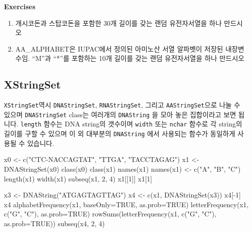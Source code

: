 \documentclass[
  a4paper,
]{book}
\newenvironment{Shaded}{\begin{snugshade}}{\end{snugshade}}
\newcommand{\AttributeTok}[1]{\textcolor[rgb]{0.40,0.45,0.13}{#1}}
\newcommand{\ConstantTok}[1]{\textcolor[rgb]{0.56,0.35,0.01}{#1}}
\newcommand{\DecValTok}[1]{\textcolor[rgb]{0.68,0.00,0.00}{#1}}
\newcommand{\FunctionTok}[1]{\textcolor[rgb]{0.28,0.35,0.67}{#1}}
\newcommand{\NormalTok}[1]{\textcolor[rgb]{0.00,0.23,0.31}{#1}}
\newcommand{\OtherTok}[1]{\textcolor[rgb]{0.00,0.23,0.31}{#1}}
\newcommand{\SpecialCharTok}[1]{\textcolor[rgb]{0.37,0.37,0.37}{#1}}
\newcommand{\StringTok}[1]{\textcolor[rgb]{0.13,0.47,0.30}{#1}}
\begin{document}
\textbf{Exercises}

\begin{enumerate}
\def\labelenumi{\arabic{enumi})}
\item
  개시코돈과 스탑코돈을 포함한 30개 길이를 갖는 랜덤 유전자서열을 하나
  만드시오
\item
  AA\_ALPHABET은 IUPAC에서 정의된 아미노산 서열 알파벳이 저장된
  내장변수임. ``M''과 ``*''를 포함하는 10개 길이를 갖는 랜덤
  유전자서열을 하나 만드시오
\end{enumerate}

\hypertarget{xstringset}{%
\subsection{XStringSet}\label{xstringset}}

\texttt{XStringSet}역시 \texttt{DNAStringSet}, \texttt{RNAStringSet},
그리고 \texttt{AAStringSet}으로 나눌 수 있으며 \texttt{DNAStringSet}
class는 여러개의 \texttt{DNAString} 을 모아 놓은 집합이라고 보면 됩니다.
\texttt{length} 함수는 DNA string의 갯수이며 \texttt{width} 또는
\texttt{nchar} 함수로 각 string의 길이를 구할 수 있으며 이 외 대부분의
\texttt{DNAString} 에서 사용되는 함수가 동일하게 사용될 수 있습니다.

\begin{Shaded}
\begin{Highlighting}[]
\NormalTok{x0 }\OtherTok{\textless{}{-}} \FunctionTok{c}\NormalTok{(}\StringTok{"CTC{-}NACCAGTAT"}\NormalTok{, }\StringTok{"TTGA"}\NormalTok{, }\StringTok{"TACCTAGAG"}\NormalTok{)}
\NormalTok{x1 }\OtherTok{\textless{}{-}} \FunctionTok{DNAStringSet}\NormalTok{(x0)}
\FunctionTok{class}\NormalTok{(x0)}
\FunctionTok{class}\NormalTok{(x1)}
\FunctionTok{names}\NormalTok{(x1)}
\FunctionTok{names}\NormalTok{(x1) }\OtherTok{\textless{}{-}} \FunctionTok{c}\NormalTok{(}\StringTok{"A"}\NormalTok{, }\StringTok{"B"}\NormalTok{, }\StringTok{"C"}\NormalTok{)}
\FunctionTok{length}\NormalTok{(x1)}
\FunctionTok{width}\NormalTok{(x1)}
\FunctionTok{subseq}\NormalTok{(x1, }\DecValTok{2}\NormalTok{, }\DecValTok{4}\NormalTok{)}
\NormalTok{x1[[}\DecValTok{1}\NormalTok{]]}
\NormalTok{x1[}\DecValTok{1}\NormalTok{]}


\NormalTok{x3 }\OtherTok{\textless{}{-}} \FunctionTok{DNAString}\NormalTok{(}\StringTok{"ATGAGTAGTTAG"}\NormalTok{)}
\NormalTok{x4 }\OtherTok{\textless{}{-}} \FunctionTok{c}\NormalTok{(x1, }\FunctionTok{DNAStringSet}\NormalTok{(x3))}
\NormalTok{x4[}\SpecialCharTok{{-}}\DecValTok{1}\NormalTok{]}
\NormalTok{x4}
\FunctionTok{alphabetFrequency}\NormalTok{(x1, }\AttributeTok{baseOnly=}\ConstantTok{TRUE}\NormalTok{, }\AttributeTok{as.prob=}\ConstantTok{TRUE}\NormalTok{)}
\FunctionTok{letterFrequency}\NormalTok{(x1, }\FunctionTok{c}\NormalTok{(}\StringTok{"G"}\NormalTok{, }\StringTok{"C"}\NormalTok{), }\AttributeTok{as.prob=}\ConstantTok{TRUE}\NormalTok{)}
\FunctionTok{rowSums}\NormalTok{(}\FunctionTok{letterFrequency}\NormalTok{(x1, }\FunctionTok{c}\NormalTok{(}\StringTok{"G"}\NormalTok{, }\StringTok{"C"}\NormalTok{), }\AttributeTok{as.prob=}\ConstantTok{TRUE}\NormalTok{))}
\FunctionTok{subseq}\NormalTok{(x4, }\DecValTok{2}\NormalTok{, }\DecValTok{4}\NormalTok{)}
\end{Highlighting}
\end{Shaded}
\end{document}
